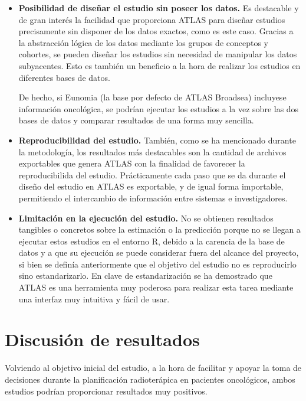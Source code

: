 \begin{itemize}
    \item \textbf{Posibilidad de diseñar el estudio sin poseer los datos.} Es destacable y de gran interés la facilidad que proporciona ATLAS para diseñar estudios precisamente sin disponer de los datos exactos, como es este caso. Gracias a la abstracción lógica de los datos mediante los grupos de conceptos y cohortes, se pueden diseñar los estudios sin necesidad de manipular los datos subyacentes. Esto es también un beneficio a la hora de realizar los estudios en diferentes bases de datos.
    
    De hecho, si Eunomia (la base por defecto de ATLAS Broadsea) incluyese información oncológica, se podrían ejecutar los estudios a la vez sobre las dos bases de datos y comparar resultados de una forma muy sencilla.

    \item \textbf{Reproducibilidad del estudio.} También, como se ha mencionado durante la metodología, los resultados más destacables son la cantidad de archivos exportables que genera ATLAS con la finalidad de favorecer la reproducibilida del estudio. Prácticamente cada paso que se da durante el diseño del estudio en ATLAS es exportable, y de igual forma importable, permitiendo el intercambio de información entre sistemas e investigadores.

    \item \textbf{Limitación en la ejecución del estudio.} No se obtienen resultados tangibles o concretos sobre la estimación o la predicción porque no se llegan a ejecutar estos estudios en el entorno R, debido a la carencia de la base de datos y a que su ejecución se puede considerar fuera del alcance del proyecto, si bien se definía anteriormente que el objetivo del estudio no es reproducirlo sino estandarizarlo. En clave de estandarización se ha demostrado que ATLAS es una herramienta muy poderosa para realizar esta tarea mediante una interfaz muy intuitiva y fácil de usar.
    
\end{itemize}

\section{Discusión de resultados} \label{sec:09resultados}

Volviendo al objetivo inicial del estudio, a la hora de facilitar y apoyar la toma de decisiones durante la planificación radioterápica en pacientes oncológicos, ambos estudios podrían proporcionar resultados muy positivos. 

